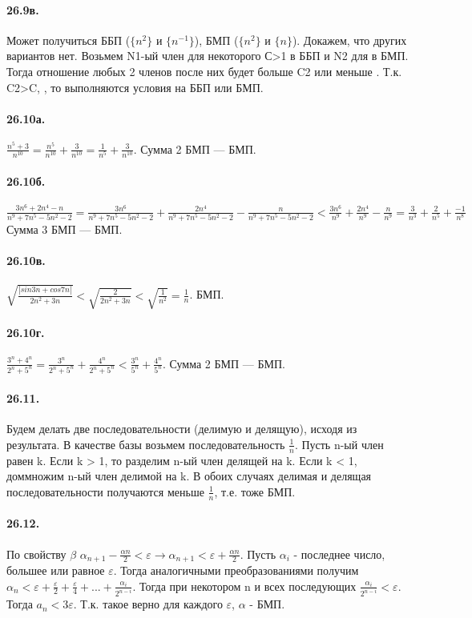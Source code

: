 \documentclass{book}
\begin{document}
\paragraph{26.9в.}
Может получиться ББП ($\{n^2\}$ и $\{{n^{-1}}\}$), БМП ($\{n^2\}$ и $\{n\}$). Докажем, что других вариантов нет. Возьмем N1-ый член для некоторого С>1 в ББП и N2  для  в БМП. Тогда отношение любых 2 членов после них будет больше C2 или меньше . Т.к. C2>C, , то выполняются условия на ББП или БМП. 

\paragraph{26.10а.}
$\frac{n^5+3}{n^10} = \frac{n^5}{n^10} + \frac{3}{n^10} = \frac{1}{n^5} + \frac{3}{n^10}$. Сумма 2 БМП — БМП.

\paragraph{26.10б.}
$\frac{3n^6 + 2n^4 - n}{n^9 + 7n^5 - 5n^2 - 2} = \frac{3n^6}{n^9+7n^5-5n^2-2} + \frac{2n^4}{n^9+7n^5-5n^2-2} - \frac{n}{n^9+7n^5-5n^2-2} < \frac{3n^6}{n^9} + \frac{2n^4}{n^9} - \frac{n}{n^9} = \frac{3}{n^3} + \frac{2}{n^5} + \frac{-1}{n^8}$ Сумма 3 БМП — БМП.

\paragraph{26.10в.}
$\sqrt{\frac{|sin 3n + cos 7n|}{2n^2+3n}} < \sqrt{\frac{2}{2n^2+3n}} < \sqrt{\frac{1}{n^2}} = \frac{1}{n}$. БМП.

\paragraph{26.10г.}
$\frac{3^n+4^n}{2^n+5^n} = \frac{3^n}{2^n+5^n} + \frac{4^n}{2^n + 5^n} < \frac{3^n}{5^n} + \frac{4^n}{5^n}$. Сумма 2 БМП — БМП.

\paragraph{26.11.}
Будем делать две последовательности (делимую и делящую), исходя из результата. В качестве базы возьмем последовательность $\frac{1}{n}$. Пусть n-ый член равен k. Если k > 1, то разделим n-ый член делящей на k. Если k < 1, доммножим n-ый член делимой на k. В обоих случаях делимая и делящая последовательности получаются меньше $\frac{1}{n}$, т.е. тоже БМП.

\paragraph{26.12.}
По свойству $\beta$ $\alpha_{n+1} - \frac{\alpha{n}}{2} < \varepsilon \rightarrow \alpha_{n+1} < \varepsilon + \frac{\alpha{n}}{2}$. Пусть $\alpha_i$ - последнее число, большее или равное $\varepsilon$. Тогда аналогичными преобразованиями получим $\alpha_n < \varepsilon + \frac{\varepsilon}{2} + \frac{\varepsilon}{4} + ... + \frac{\alpha_i}{2^{n-i}}$. Тогда при некотором n и всех последующих $\frac{\alpha_i}{2^{n-i}} < \varepsilon$. Тогда $a_n < 3 \varepsilon$. Т.к. такое верно для каждого $\varepsilon$, $\alpha$ - БМП.
\end{document}
